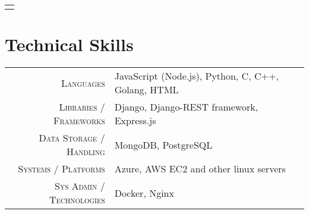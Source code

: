 \documentclass[a4paper,10pt]{extarticle} %
\begin{document}
\begin{tabular}{p{19.7cm}}
{\begin{description}[style=nextline, font=$\bullet$\hspace{2mm}\normalsize]
 


\end{description}
\end{tabular}

\vspace{0.2cm}
\section{\textcolor{primary}{Technical Skills}}
\vspace{0.2cm}

\begin{tabular}{r|p{15cm}}
\textsc{Languages} & JavaScript (Node.js), Python, C, C++, Golang, HTML \\
\textsc{Libraries / Frameworks} & Django, Django-REST framework, Express.js \\
\textsc{Data Storage / Handling} & MongoDB, PostgreSQL \\
\textsc{Systems / Platforms} & Azure, AWS EC2 and other linux servers \\
\textsc{Sys Admin / Technologies} & Docker, Nginx\\

\end{tabular}
\end{document}

